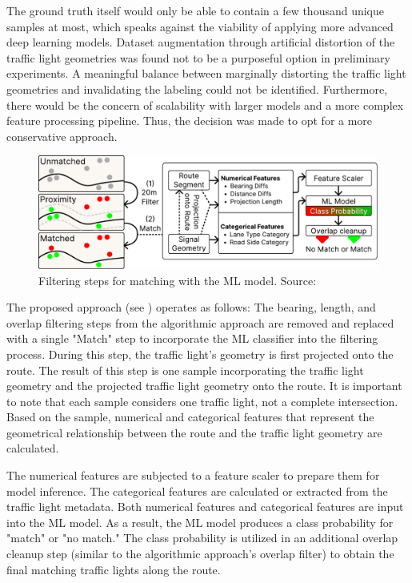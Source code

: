 The ground truth itself would only be able to contain a few thousand unique samples at most, which speaks against the viability of applying more advanced deep learning models. Dataset augmentation through artificial distortion of the traffic light geometries was found not to be a purposeful option in preliminary experiments. A meaningful balance between marginally distorting the traffic light geometries and invalidating the labeling could not be identified. Furthermore, there would be the concern of scalability with larger models and a more complex feature processing pipeline. Thus, the decision was made to opt for a more conservative approach.

\begin{figure}[t]
\centering
\includegraphics[width=\linewidth]{images/sg-matching-ml-model.pdf}
\caption{Filtering steps for matching with the ML model. Source: \cite{matthes2023geo}}
\label{fig:sg-matching-ml-model}
\end{figure}

The proposed approach (see ) operates as follows: The bearing, length, and overlap filtering steps from the algorithmic approach are removed and replaced with a single "Match" step to incorporate the ML classifier into the filtering process. During this step, the traffic light's geometry is first projected onto the route. The result of this step is one sample incorporating the traffic light geometry and the projected traffic light geometry onto the route. It is important to note that each sample considers one traffic light, not a complete intersection. Based on the sample, numerical and categorical features that represent the geometrical relationship between the route and the traffic light geometry are calculated.

The numerical features are subjected to a feature scaler to prepare them for model inference. The categorical features are calculated or extracted from the traffic light metadata. Both numerical features and categorical features are input into the ML model. As a result, the ML model produces a class probability for "match" or "no match." The class probability is utilized in an additional overlap cleanup step (similar to the algorithmic approach's overlap filter) to obtain the final matching traffic lights along the route.

